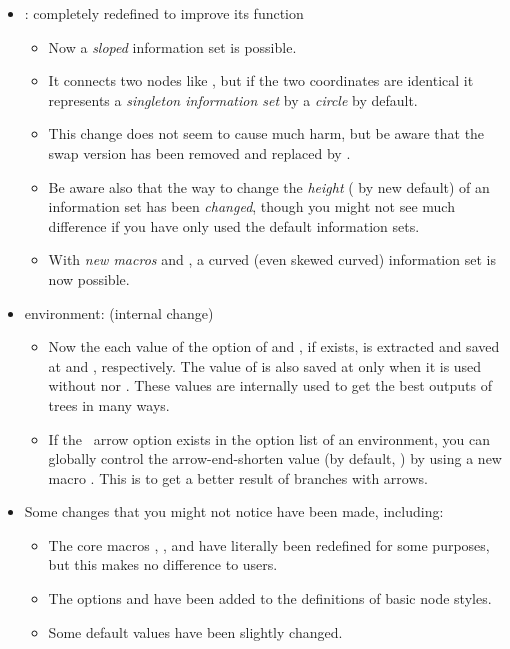 \begin{itemize}\firmlist
\item \cmd{\xtInfosetO}: completely redefined to improve its function
  \begin{itemize}
  \item Now a \emph{sloped} information set is possible.
  \item It connects two nodes like , 
        but if the two coordinates are identical it represents a \emph{singleton information set} 
        by a \emph{circle} by default.
  \item This change does not seem to cause much harm, but be aware that 
        the swap version  has been removed and replaced by \cmd{\xtInfosetO}.
  \item Be aware also that the way to change the \emph{height} (\xw{1em} by new default) 
        of an information set has been \emph{changed}, 
        though you might not see much difference if you have only used the default information sets.
  \item With \emph{new macros} \cmd{\xtCInfoset} and \cmd{\xtCInfosetO}, a curved (even skewed curved) information set is now possible.
  \end{itemize}
\item {} environment: (internal change)
  \begin{itemize}
  \item Now the each value of the option of  and , if exists, 
        is extracted and saved at \cmd{\xtxscale} and \cmd{\xtyscale}, respectively.
        The value of  is also saved at \cmd{\xtscale} 
        only when it is used without  nor . 
        These values are internally used to get the best outputs of trees in many ways.
  \item If the \Tikz\ arrow option \xw{->} exists in the option list of an  environment, 
        you can globally control the arrow-end-shorten value (by default, ) 
        by using a new macro \cmd{\setistgameshorten}. 
        This is to get a better result of branches with arrows.
  \end{itemize}
\item Some changes that you might not notice have been made, including:
  \begin{itemize}
  \item The core macros \cmd{\istroot}, \cmd{\istb}, and \cmd{\endist} have literally been redefined 
        for some purposes, but this makes no difference to users.
  \item The options  and  have been added to the definitions of basic node styles.
  \item Some default values have been slightly changed.
  \end{itemize}
\end{itemize}

